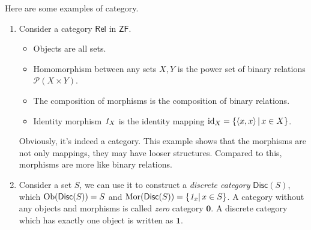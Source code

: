 \documentclass{article}
\begin{document}
\begin{exm}
	Here are some examples of category.
	\begin{enumerate}
		\item Consider a category $\mathsf{Rel}$ in $\mathsf{ZF}$.
		\begin{itemize}
			\item Objects are all sets.
			\item Homomorphism between any sets $X,Y$ is the power set of binary relations $\mathscr{P}(X\times Y)$.
			\item The composition of morphisms is the composition of binary relations.
			\item Identity morphism $\mathit{1}_X$ is the identity mapping $\mathrm{id}_X=\{\left<x,x\right>|\,x\in X\}$.
		\end{itemize}
		Obviously, it's indeed a category. This example shows that the morphisms are not only mappings, they may have looser structures. Compared to this, morphisms are more like binary relations.
	
		\item Consider a set $S$, we can use it to construct a \emph{discrete category} $\mathsf{Disc}(S)$, which $\mathrm{Ob}(\mathsf{Disc}(S))=S$ and $\mathrm{Mor}(\mathsf{Disc}(S))=\{\mathit{1}_x|\,x\in S\}$. A category without any objects and morphisms is called \emph{zero} category $\mathbf{0}$. A discrete category which has exactly one object is written as $\mathbf{1}$.
		

\end{enumerate}
\end{exm}
\end{document}
